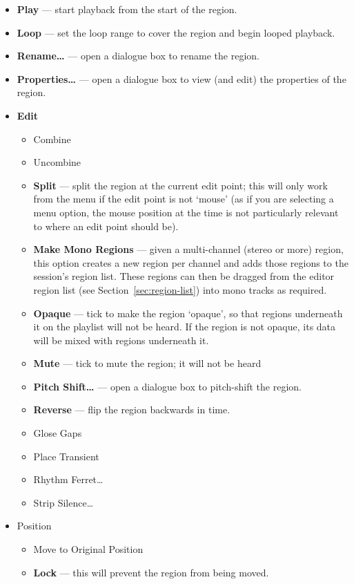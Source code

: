 \documentclass[10pt,a4paper]{book}
\begin{document}
{\begin{itemize}
\item \textbf{Play} --- start playback from the start of the region.
\item \textbf{Loop} --- set the loop range to cover the region and begin looped playback.
\item \textbf{Rename\ldots} --- open a dialogue box to rename the region.
\item \textbf{Properties\ldots} --- open a dialogue box to view (and edit) the properties of the region.
\item \textbf{Edit}
\begin{itemize}
\item Combine
\item Uncombine
\item \textbf{Split} --- split the region at the current edit point;
  this will only work from the menu if the edit point is not `mouse'
  (as if you are selecting a menu option, the mouse position at the
  time is not particularly relevant to where an edit point should be).
\item \textbf{Make Mono Regions} --- given a multi-channel (stereo or
  more) region, this option creates a new region per channel and adds
  those regions to the session's region list.  These regions can then
  be dragged from the editor region list (see
  Section~\ref{sec:region-list}) into mono tracks as required.
\item \textbf{Opaque} --- tick to make the region `opaque', so that
  regions underneath it on the playlist will not be heard.  If the
  region is not opaque, its data will be mixed with regions underneath
  it.
\item \textbf{Mute} --- tick to mute the region; it will not be heard
\item \textbf{Pitch Shift\ldots} --- open a dialogue box to
  pitch-shift the region.
\item \textbf{Reverse} --- flip the region backwards in time.
\item Glose Gaps
\item Place Transient
\item Rhythm Ferret\ldots
\item Strip Silence\ldots
\end{itemize}
\item Position
\begin{itemize}
\item Move to Original Position
\item \textbf{Lock} --- this will prevent the region from being moved.

\end{itemize}
\end{itemize}}
\end{document}
